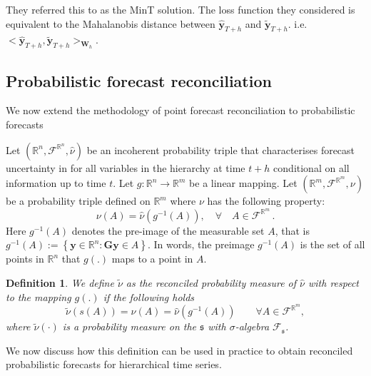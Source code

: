 \documentclass[a4paper, 11pt]{article}
\newtheorem{definition}{Definition}[section]
\begin{document}
They referred this to as the MinT solution. The loss function they considered is equivalent to the Mahalanobis distance between $\hat{\bm{y}}_{T+h}$ and $\tilde{\bm{y}}_{T+h}$. i.e. $<\hat{\bm{y}}_{T+h}, \tilde{\bm{y}}_{T+h}>_{\bm{W}_h}$.

\subsection{Probabilistic forecast reconciliation}

We now extend the methodology of point forecast reconciliation to probabilistic forecasts


  Let $(\mathbb{R}^n, \mathscr{F}^{\mathbb{R}^n}, \hat{\nu})$ be an incoherent probability triple that characterises forecast uncertainty in for all variables in the hierarchy at time $t+h$ conditional on all information up to time $t$.  Let $g:\mathbb{R}^n \rightarrow \mathbb{R}^m $ be a linear mapping.  Let $(\mathbb{R}^m, \mathscr{F}^{\mathbb{R}^m}, \nu)$ be a probability triple defined on $\mathbb{R}^m$ where $\nu$ has the following property:
  \begin{equation}
  \nu(A) = \hat{\nu}(g^{-1}(A)), \quad \forall \quad A \in \mathscr{F}^{\mathbb{R}^m}\,.
  \end{equation}
  Here $g^{-1}(A)$ denotes the pre-image of the measurable set $A$, that is $g^{-1}(A):=\left\{\bm{y}\in \mathbb{R}^n:\bm{Gy}\in A \right\}$. In words, the preimage $g^{-1}(A)$ is the set of all points in $\mathbb{R}^n$ that $g(.)$ maps to a point in $A$.
  \begin{definition} \label{def:reconprob}
  We define $\tilde{\nu}$ as the reconciled probability measure of $\hat{\nu}$ with respect to the mapping $g(.)$ if the following holds
  \begin{equation}
  \tilde{\nu}(s(A)) = \nu(A)= \hat{\nu}(g^{-1}(A)) \qquad \forall A \in \mathscr{F}^{\mathbb{R}^m},
  \end{equation}
  where $\tilde{\nu}(\cdot)$ is a probability measure on the $\mathfrak{s}$ with $\sigma$-algebra $\mathscr{F}_\mathfrak{s}$.
\end{definition}

We now discuss how this definition can be used in practice to obtain reconciled probabilistic forecasts for hierarchical time series.
\end{document}
